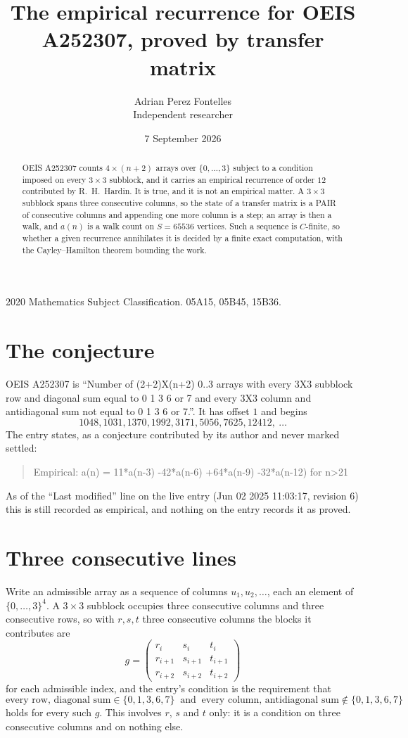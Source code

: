 \documentclass[11pt,a4paper]{article}
\title{The empirical recurrence for OEIS A252307, proved by transfer matrix}
\author{Adrian Perez Fontelles\\ \small Independent researcher}
\date{7 September 2026}
\theoremstyle{plain}
\theoremstyle{definition}
\begin{document}
\maketitle

\begin{abstract}
OEIS A252307 counts $4\times(n+2)$ arrays over $\{0,\dots,3\}$ subject to a condition imposed on
every $3\times3$ subblock, and it carries an empirical recurrence of order $12$
contributed by R.~H.~Hardin. It is true, and it is not an empirical matter. A $3\times3$
subblock spans three consecutive columns, so the state of a transfer matrix is a PAIR of
consecutive columns and appending one more column is a step; an array is then a walk, and
$a(n)$ is a walk count on $S=65536$ vertices. Such a sequence is $C$-finite, so whether a given
recurrence annihilates it is decided by a finite exact computation, with the Cayley--Hamilton
theorem bounding the work.
\end{abstract}

\noindent\small 2020 Mathematics Subject Classification. 05A15, 05B45, 15B36.\normalsize

\section{The conjecture}

OEIS A252307 is ``Number of (2+2)X(n+2) 0..3 arrays with every 3X3 subblock row and diagonal sum equal to 0 1 3 6 or 7 and every 3X3 column and antidiagonal sum not equal to 0 1 3 6 or 7.''. It has offset $1$ and begins
\[
1048, 1031, 1370, 1992, 3171, 5056, 7625, 12412,\ \dots
\]
The entry states, as a conjecture contributed by its author and never marked settled:
\begin{quote}
Empirical: a(n) = 11*a(n-3) -42*a(n-6) +64*a(n-9) -32*a(n-12) for n>21
\end{quote}
As of the ``Last modified'' line on the live entry (Jun 02 2025 11:03:17, revision 6) this is still
recorded as empirical, and nothing on the entry records it as proved.

\section{Three consecutive lines}

Write an admissible array as a sequence of columns $u_1,u_2,\dots$, each an element of
$\{0,\dots,3\}^{4}$. A $3\times3$ subblock occupies three consecutive columns and
three consecutive rows, so with $r,s,t$ three consecutive columns the blocks it
contributes are
\[
g=\begin{pmatrix}r_i&s_i&t_i\\ r_{i+1}&s_{i+1}&t_{i+1}\\ r_{i+2}&s_{i+2}&t_{i+2}\end{pmatrix}
\]
for each admissible index, and the entry's condition is the requirement that
\[
\text{every row, diagonal sum} \in \{0,1,3,6,7\}\ \text{ and }\ \text{every column, antidiagonal sum} \notin \{0,1,3,6,7\}
\]
holds for every such $g$. This involves $r$, $s$ and $t$ only: it is a condition on
three consecutive columns and on nothing else.
\end{document}
